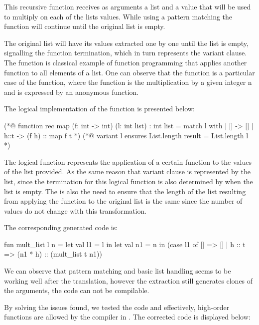 This recursive function  receives as arguments a list and a value that will be used to multiply on each of the
lists values. While using a pattern matching the function will continue until the original list is empty.

The original list will have its values extracted one by one until the list is empty, signalling the function termination, which in turn
represents the variant clause. The function  is classical example of function programming that applies another function 
to all elements of a list. One can observe that the  function is a particular case of the  
function, where the function is the multiplication by a given integer n and is expressed by an anonymous function. 

The logical implementation of the  function is presented below:

\begin{gospell}
(*@ function rec map (f: int -> int) (l: int list) : int list = 
        match l with
        | [] -> []
        | h::t -> (f h) :: map f t *)
(*@ variant l
        ensures List.length result = List.length l *)
\end{gospell}

The logical function  represents the application of a certain function to the values of the list provided. As the same
reason that variant clause is represented by the list, since the termination for this logical function is also determined by when the
list is empty. The is also the need to ensure that the length of the list resulting from applying the function to the original list
is the same since the number of values do not change with this transformation.

The corresponding generated code is:

\begin{cakeml}
fun mult_list l n = let val l1 = l in
    let val n1 = n in
    (case l1 of
        [] => []
    | h :: t => (n1 * h) :: (mult_list t n1))
\end{cakeml}

We can observe that pattern matching and basic list handling seems to be working well after the translation, however the extraction 
still generates clones of the arguments, the code can not be compilable. 

By solving the issues found, we tested the code and effectively, high-order functions are allowed by the compiler in \cml. The corrected 
code is displayed below:

